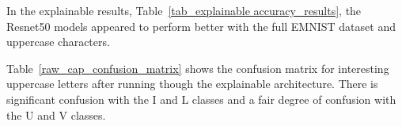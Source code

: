 \documentclass[conference]{IEEEtran}
\begin{document}
In the explainable results, Table~\ref{tab_explainable accuracy_results}, the
Resnet50 models appeared to perform better with the full EMNIST dataset and
uppercase characters.

\begin{table}
    \centering
    \caption{Explainable accuracy results on various balanced EMNIST data sets with differing NN models}
    \label{tab_explainable accuracy_results}
\end{table}

Table~\ref{raw_cap_confusion_matrix} shows the confusion matrix for interesting
uppercase letters after running though the explainable architecture. There is
significant confusion with the I and L classes and a fair degree of confusion
with the U and V classes.

\end{document}
